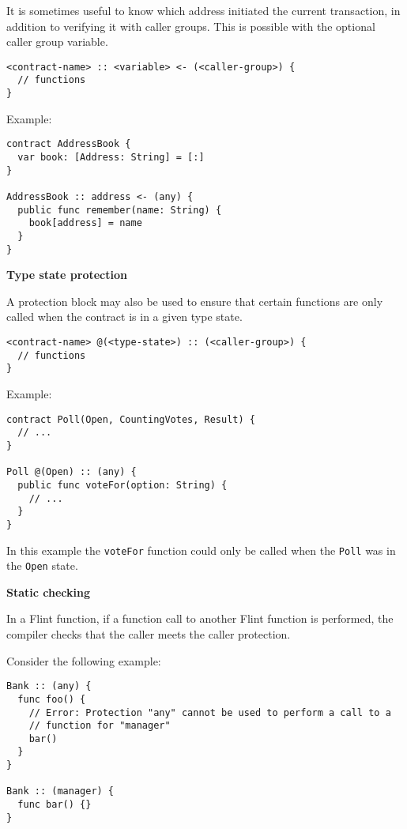 It is sometimes useful to know which address initiated the current transaction, in addition to verifying it with caller groups. This is possible with the optional caller group variable.

\begin{verbatim}
<contract-name> :: <variable> <- (<caller-group>) {
  // functions
}
\end{verbatim}

Example:

\begin{verbatim}
contract AddressBook {
  var book: [Address: String] = [:]
}

AddressBook :: address <- (any) {
  public func remember(name: String) {
    book[address] = name
  }
}
\end{verbatim}

\textbf{Type state protection}
\label{sec:appendix-b-type-state-protection}

A protection block may also be used to ensure that certain functions are only called when the contract is in a given type state.

\begin{verbatim}
<contract-name> @(<type-state>) :: (<caller-group>) {
  // functions
}
\end{verbatim}

Example:

\begin{verbatim}
contract Poll(Open, CountingVotes, Result) {
  // ...
}

Poll @(Open) :: (any) {
  public func voteFor(option: String) {
    // ...
  }
}
\end{verbatim}

In this example the \texttt{voteFor} function could only be called when the \texttt{Poll} was in the \texttt{Open} state.

\textbf{Static checking}
\label{sec:appendix-b-static-checking}

In a Flint function, if a function call to another Flint function is performed, the compiler checks that the caller meets the caller protection.

Consider the following example:

\begin{verbatim}
Bank :: (any) {
  func foo() {
    // Error: Protection "any" cannot be used to perform a call to a
    // function for "manager"
    bar()
  }
}

Bank :: (manager) {
  func bar() {}
}
\end{verbatim}

